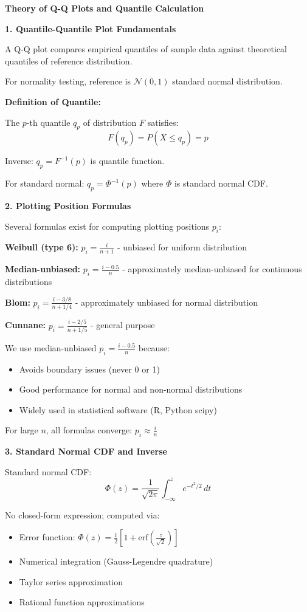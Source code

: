 \documentclass[12pt]{article}
\begin{document}
\begin{explanation}

\textbf{Theory of Q-Q Plots and Quantile Calculation}

\textbf{1. Quantile-Quantile Plot Fundamentals}

A Q-Q plot compares empirical quantiles of sample data against theoretical quantiles of reference distribution.

For normality testing, reference is $\mathcal{N}(0,1)$ standard normal distribution.

\textbf{Definition of Quantile:}

The $p$-th quantile $q_p$ of distribution $F$ satisfies:
\[F(q_p) = P(X \leq q_p) = p\]

Inverse: $q_p = F^{-1}(p)$ is quantile function.

For standard normal: $q_p = \Phi^{-1}(p)$ where $\Phi$ is standard normal CDF.

\textbf{2. Plotting Position Formulas}

Several formulas exist for computing plotting positions $p_i$:

\textbf{Weibull (type 6):} $p_i = \frac{i}{n+1}$ - unbiased for uniform distribution

\textbf{Median-unbiased:} $p_i = \frac{i - 0.5}{n}$ - approximately median-unbiased for continuous distributions

\textbf{Blom:} $p_i = \frac{i - 3/8}{n + 1/4}$ - approximately unbiased for normal distribution

\textbf{Cunnane:} $p_i = \frac{i - 2/5}{n + 1/5}$ - general purpose

We use median-unbiased $p_i = \frac{i-0.5}{n}$ because:
\begin{itemize}
\item Avoids boundary issues (never 0 or 1)
\item Good performance for normal and non-normal distributions
\item Widely used in statistical software (R, Python scipy)
\end{itemize}

For large $n$, all formulas converge: $p_i \approx \frac{i}{n}$

\textbf{3. Standard Normal CDF and Inverse}

Standard normal CDF:
\[\Phi(z) = \frac{1}{\sqrt{2\pi}} \int_{-\infty}^z e^{-t^2/2} \, dt\]

No closed-form expression; computed via:
\begin{itemize}
\item Error function: $\Phi(z) = \frac{1}{2}\left[1 + \text{erf}\left(\frac{z}{\sqrt{2}}\right)\right]$
\item Numerical integration (Gauss-Legendre quadrature)
\item Taylor series approximation
\item Rational function approximations
\end{itemize}


\end{explanation}
\end{document}
